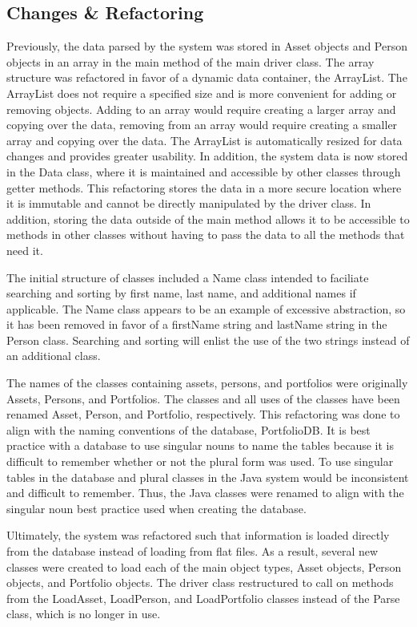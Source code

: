 \documentclass[12pt]{scrartcl} %
\begin{document}
    \subsection{Changes \& Refactoring}

    Previously, the data parsed by the system was stored in Asset objects and Person objects in an array in the main method of the main driver class.  The array structure was refactored in favor of a dynamic data container, the ArrayList.  The ArrayList does not require a specified size and is more convenient for adding or removing objects.  Adding to an array would require creating a larger array and copying over the data, removing from an array would require creating a smaller array and copying over the data.  The ArrayList is automatically resized for data changes and provides greater usability.  In addition, the system data is now stored in the Data class, where it is maintained and accessible by other classes through getter methods.  This refactoring stores the data in a more secure location where it is immutable and cannot be directly manipulated by the driver class.  In addition, storing the data outside of the main method allows it to be accessible to methods in other classes without having to pass the data to all the methods that need it.

    The initial structure of classes included a Name class intended to faciliate searching and sorting by first name, last name, and additional names if applicable.  The Name class appears to be an example of excessive abstraction, so it has been removed in favor of a firstName string and lastName string in the Person class.  Searching and sorting will enlist the use of the two strings instead of an additional class.

    The names of the classes containing assets, persons, and portfolios were originally Assets, Persons, and Portfolios.  The classes and all uses of the classes have been renamed Asset, Person, and Portfolio, respectively.  This refactoring was done to align with the naming conventions of the database, PortfolioDB.  It is best practice with a database to use singular nouns to name the tables because it is difficult to remember whether or not the plural form was used.  To use singular tables in the database and plural classes in the Java system would be inconsistent and difficult to remember.  Thus, the Java classes were renamed to align with the singular noun best practice used when creating the database.

    Ultimately, the system was refactored such that information is loaded directly from the database instead of loading from flat files.  As a result, several new classes were created to load each of the main object types, Asset objects, Person objects, and Portfolio objects.  The driver class restructured to call on methods from the LoadAsset, LoadPerson, and LoadPortfolio classes instead of the Parse class, which is no longer in use.
\end{document}
